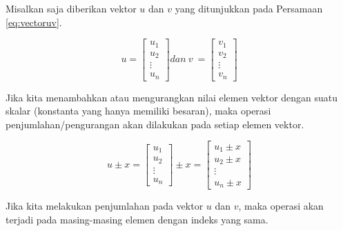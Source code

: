 \documentclass[
]{book}
\theoremstyle{definition}
\theoremstyle{definition}
\theoremstyle{definition}
\theoremstyle{definition}
\theoremstyle{remark}
\begin{document}
Misalkan saja diberikan vektor \(u\) dan \(v\) yang ditunjukkan pada Persamaan \eqref{eq:vectoruv}.

\begin{equation}
u = \begin{bmatrix}
      u_1            \\[0.3em]
      u_2            \\[0.3em]
      \vdots         \\[0.3em] 
      u_n
     \end{bmatrix}
dan\ v\ = \begin{bmatrix}
      v_1            \\[0.3em]
      v_2            \\[0.3em]
      \vdots         \\[0.3em] 
      v_n
     \end{bmatrix}
  \label{eq:vectoruv}
\end{equation}

Jika kita menambahkan atau mengurangkan nilai elemen vektor dengan suatu skalar (konstanta yang hanya memiliki besaran), maka operasi penjumlahan/pengurangan akan dilakukan pada setiap elemen vektor.

\begin{equation}
u \pm x = \begin{bmatrix}
      u_1            \\[0.3em]
      u_2            \\[0.3em]
      \vdots         \\[0.3em] 
      u_n
     \end{bmatrix}
\pm x = \begin{bmatrix}
      u_1 \pm x            \\[0.3em]
      u_2 \pm x           \\[0.3em]
      \vdots         \\[0.3em] 
      u_n \pm x
     \end{bmatrix}
     \label{eq:addvector}
\end{equation}

Jika kita melakukan penjumlahan pada vektor \(u\) dan \(v\), maka operasi akan terjadi pada masing-masing elemen dengan indeks yang sama.
\end{document}
